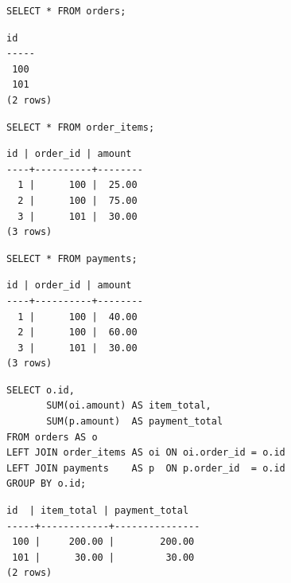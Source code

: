 \documentclass[12pt]{article}
\begin{document}
\begin{lrbox}{\ordersdata}\begin{minipage}{7.2cm}
\begin{lstlisting}[style=sql]
SELECT * FROM orders;
\end{lstlisting}
\begin{lstlisting}[style=mono]
 id
-----
 100
 101
(2 rows)
\end{lstlisting}
\end{minipage}\end{lrbox}
\begin{lrbox}{\itemsdata}\begin{minipage}{7.2cm}
\begin{lstlisting}[style=sql]
SELECT * FROM order_items;
\end{lstlisting}
\begin{lstlisting}[style=mono]
 id | order_id | amount
----+----------+--------
  1 |      100 |  25.00
  2 |      100 |  75.00
  3 |      101 |  30.00
(3 rows)
\end{lstlisting}
\end{minipage}\end{lrbox}
\begin{lrbox}{\paymentsdata}\begin{minipage}{7.2cm}
\begin{lstlisting}[style=sql]
SELECT * FROM payments;
\end{lstlisting}
\begin{lstlisting}[style=mono]
 id | order_id | amount
----+----------+--------
  1 |      100 |  40.00
  2 |      100 |  60.00
  3 |      101 |  30.00
(3 rows)
\end{lstlisting}
\end{minipage}\end{lrbox}

\begin{lrbox}{\rawon}\begin{minipage}{11.9cm}
\begin{lstlisting}[style=sql]
SELECT o.id,
       SUM(oi.amount) AS item_total,
       SUM(p.amount)  AS payment_total
FROM orders AS o
LEFT JOIN order_items AS oi ON oi.order_id = o.id
LEFT JOIN payments    AS p  ON p.order_id  = o.id
GROUP BY o.id;
\end{lstlisting}
\vspace{.25cm}
\begin{lstlisting}[style=mono]
 id  | item_total | payment_total
-----+------------+---------------
 100 |     200.00 |        200.00
 101 |      30.00 |         30.00
(2 rows)
\end{lstlisting}
\end{minipage}\end{lrbox}
\end{document}
